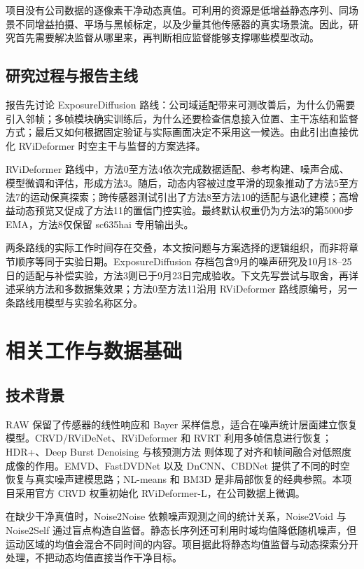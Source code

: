\documentclass[11pt,a4paper,UTF8,fontset=fandol]{ctexart}
\begin{document}
项目没有公司数据的逐像素干净动态真值。可利用的资源是低增益静态序列、同场景不同增益拍摄、平场与黑帧标定，以及少量其他传感器的真实场景流。因此，研究首先需要解决监督从哪里来，再判断相应监督能够支撑哪些模型改动。

\subsection{研究过程与报告主线}

报告先讨论 ExposureDiffusion 路线：公司域适配带来可测改善后，为什么仍需要引入邻帧；多帧模块确实训练后，为什么还要检查信息接入位置、主干冻结和监督方式；最后又如何根据固定验证与实际画面决定不采用这一候选。由此引出直接优化 RViDeformer 时空主干与监督的方案选择。

RViDeformer 路线中，方法0至方法4依次完成数据适配、参考构建、噪声合成、模型微调和评估，形成方法3。随后，动态内容被过度平滑的现象推动了方法5至方法7的运动保真探索；跨传感器测试引出了方法8至方法10的适配与退化建模；高增益动态预览又促成了方法11的置信门控实验。最终默认权重仍为方法3的第5000步 EMA，方法8仅保留 sc635hai 专用输出头。

两条路线的实际工作时间存在交叠，本文按问题与方案选择的逻辑组织，而非将章节顺序等同于实验日期。ExposureDiffusion 存档包含9月的噪声研究及10月18--25日的适配与补偿实验，方法3则已于9月23日完成验收。下文先写尝试与取舍，再详述采纳方法和多数据集效果；方法0至方法11沿用 RViDeformer 路线原编号，另一条路线用模型与实验名称区分。

\section{相关工作与数据基础}

\subsection{技术背景}

RAW 保留了传感器的线性响应和 Bayer 采样信息，适合在噪声统计层面建立恢复模型。CRVD/RViDeNet\cite{r1}、RViDeformer\cite{r2} 和 RVRT\cite{r3} 利用多帧信息进行恢复；HDR+\cite{r10}、Deep Burst Denoising\cite{r9} 与核预测方法\cite{r17} 则体现了对齐和帧间融合对低照度成像的作用。EMVD\cite{r15}、FastDVDNet\cite{r16} 以及 DnCNN\cite{r14}、CBDNet\cite{r20} 提供了不同的时空恢复与真实噪声建模思路；NL-means\cite{r18} 和 BM3D\cite{r19} 是非局部恢复的经典参照。本项目采用官方 CRVD 权重初始化 RViDeformer-L，在公司数据上微调。

在缺少干净真值时，Noise2Noise\cite{r4} 依赖噪声观测之间的统计关系，Noise2Void\cite{r5} 与 Noise2Self\cite{r6} 通过盲点构造自监督。静态长序列还可利用时域均值降低随机噪声，但运动区域的均值会混合不同时间的内容。项目据此将静态均值监督与动态探索分开处理，不把动态均值直接当作干净目标。
\end{document}
